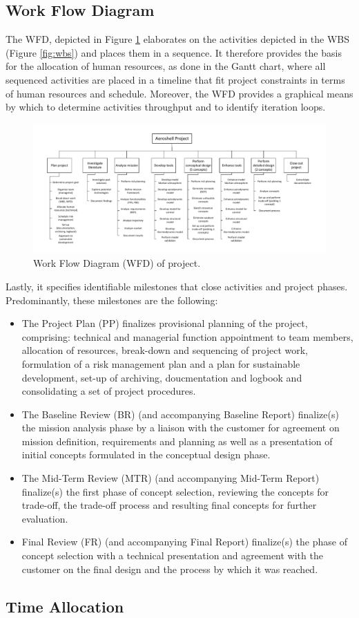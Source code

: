\subsection{Work Flow Diagram}\label{sec:WFD}
The WFD, depicted in Figure \ref{fig:wfd} elaborates on the activities depicted in the WBS (Figure \ref{fig:wbs}) and places them in a sequence. It therefore provides the basis for the allocation of human resources, as done in the Gantt chart, where all sequenced activities are placed in a timeline that fit project constraints in terms of human resources and schedule. Moreover, the WFD provides a graphical means by which to determine activities throughput and to identify iteration loops. 

\begin{figure}
    \includegraphics{Figure/WBS.pdf}
    \caption{Work Flow Diagram (WFD) of project.}
    \label{fig:wfd}
\end{figure}

Lastly, it specifies identifiable milestones that close activities and project phases. Predominantly, these milestones are the following:
\begin{itemize}
\item The Project Plan (PP) finalizes provisional planning of the project, comprising: technical and managerial function appointment to team members, allocation of resources, break-down and sequencing of project work, formulation of a risk management plan and a plan for sustainable development, set-up of archiving, doucmentation and logbook and consolidating a set of project procedures.
\item The Baseline Review (BR) (and accompanying Baseline Report) finalize(s) the mission analysis phase by a liaison with the customer for agreement on mission definition, requirements and planning as well as a presentation of initial concepts formulated in the conceptual design phase.
\item The Mid-Term Review (MTR) (and accompanying Mid-Term Report) finalize(s) the first phase of concept selection, reviewing the concepts for trade-off, the trade-off process and resulting final concepts for further evaluation.
\item Final Review (FR) (and accompanying Final Report) finalize(s) the phase of concept selection with a technical presentation and agreement with the customer on the final design and the process by which it was reached. 
\end{itemize}

\subsection{Time Allocation}\label{sec:timeallocation}


